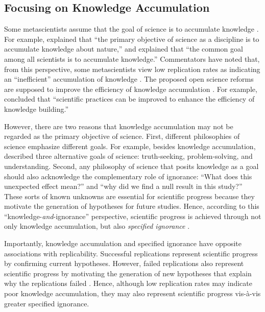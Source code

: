 \documentclass[authordate, meta, issue]{jote-new-article}
\begin{document}
\subsection{Focusing on Knowledge Accumulation}



Some metascientists assume that the goal of science is to accumulate knowledge \parencites[e.g.,][p. 1]{Errington2021b}{Munafò2017}{Nosek2012}{Vazire2018}. For example, \textcite[p. 617]{Nosek2012} explained that “the primary objective of science as a discipline is to accumulate knowledge about nature,” and \textcite[p. 416]{Vazire2018} explained that “the common goal among all scientists is to accumulate knowledge.” Commentators have noted that, from this perspective, some metascientists view low replication rates as indicating an “inefficient” accumulation of knowledge \parencites{Morawski2022}{Peterson2021}[for examples, see][]{Errington2021b}{Munafò2017}{Nosek2012}{Vazire2018}[for discussions, see][]{Hostler2022}{UygunTunç2022}. The proposed open science reforms are supposed to improve the efficiency of knowledge accumulation \parencites[e.g.,][p. 37]{Chambers2022}[p. 626]{Nosek2012}. For example, \textcite[p. 626]{Nosek2012} concluded that “scientific practices can be improved to enhance the efficiency of knowledge building.”



However, there are two reasons that knowledge accumulation may not be regarded as the primary objective of science. First, different philosophies of science emphasize different goals. For example, besides knowledge accumulation, \textcite{Dellsén2018} described three alternative goals of science: truth-seeking, problem-solving, and understanding. Second, any philosophy of science that posits knowledge as a goal should also acknowledge the complementary role of ignorance: “What does this unexpected effect mean?” and “why did we find a null result in this study?” These sorts of known unknowns are essential for scientific progress because they motivate the generation of hypotheses for future studies. Hence, according to this “knowledge-\emph{and}-ignorance” perspective, scientific progress is achieved through not only knowledge accumulation, but also \emph{specified ignorance} \parencites{Firestein2012}{Merton1987}[][p. 7]{Collaboration2015}[p. 5826]{Rubin2021a}{Smithson1996}.



Importantly, knowledge accumulation and specified ignorance have opposite associations with replicability. Successful replications represent scientific progress by confirming current hypotheses. However, failed replications also represent scientific progress by motivating the generation of new hypotheses that explain why the replications failed \parencites[e.g., by positing boundary conditions; for an example, see][]{Firestein2012}. Hence, although low replication rates may indicate poor knowledge accumulation, they may also represent scientific progress vis-à-vis greater specified ignorance.
\end{document}
